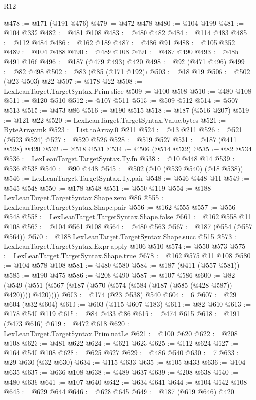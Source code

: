 \begin{lexlean}{R12}
\begin{coremodule}
@478 := @171 (@191 @476)
@479 := @472 @478
@480 := @104 @199
@481 := @104 @332
@482 := @481 @108
@483 := @480 @482
@484 := @114 @483
@485 := @112 @484
@486 := @162 @189
@487 := @486 @91
@488 := @105 @352
@489 := @104 @488
@490 := @489 @108
@491 := @487 @490
@493 := @485 @491 @166
@496 := @187 (@479 @493) @420
@498 := @92 (@471 @496)
@499 := @82 @498
@502 := @83 (@85 (@171 @192))
@503 := @18 @19
@506 := @502 (@23 @503) @22
@507 := @178 @22
@508 := LexLeanTarget.TargetSyntax.Prim.slice
@509 := @100 @508
@510 := @480 @108
@511 := @120 @510
@512 := @107 @511
@513 := @509 @512
@514 := @507 @513
@515 := @473 @86
@516 := @190 @515
@518 := @187 (@516 @207)
@519 := @121 @22
@520 := LexLeanTarget.TargetSyntax.Value.bytes
@521 := ByteArray.mk
@523 := List.toArray.{0} @211
@524 := @13 @211
@526 := @521 (@523 @524)
@527 := @520 @526
@528 := @519 @527
@531 := @187 (@411 @528) @420
@532 := @518 @531
@534 := @506 (@514 @532)
@535 := @82 @534
@536 := LexLeanTarget.TargetSyntax.Ty.fn
@538 := @10 @448 @14
@539 := @536 @538
@540 := @90 @448
@545 := @502 (@10 (@539 @540) (@18 @538))
@546 := LexLeanTarget.TargetSyntax.Ty.pair
@548 := @546 @448 @11
@549 := @545 @548
@550 := @178 @548
@551 := @550 @119
@554 := @188 LexLeanTarget.TargetSyntax.Shape.zero @86
@555 := LexLeanTarget.TargetSyntax.Shape.pair
@556 := @162 @555
@557 := @556 @548
@558 := LexLeanTarget.TargetSyntax.Shape.false
@561 := @162 @558 @11 @108
@563 := @104 @561 @108
@564 := @480 @563
@567 := @187 (@554 (@557 @564))
@570 := @188 LexLeanTarget.TargetSyntax.Shape.succ @515
@573 := LexLeanTarget.TargetSyntax.Expr.apply @106 @510
@574 := @550 @573
@575 := LexLeanTarget.TargetSyntax.Shape.true
@578 := @162 @575 @11 @108
@580 := @104 @578 @108
@581 := @480 @580
@584 := @187 (@411 (@557 @581))
@585 := @190 @475
@586 := @208 @490
@587 := @107 @586
@600 := @82 (@549 (@551 (@567 (@187 (@570 (@574 (@584 (@187 (@585 (@428 @587)) @420)))) @420))))
@603 := @174 (@23 @538) @540
@604 := 6
@607 := @29 @604 (@32 @604)
@610 := @603 (@115 @607 @183)
@611 := @82 @610
@613 := @178 @540 @119
@615 := @84 @433 @86
@616 := @474 @615
@618 := @191 (@473 @616)
@619 := @472 @618
@620 := LexLeanTarget.TargetSyntax.Prim.natLe
@621 := @100 @620
@622 := @208 @108
@623 := @481 @622
@624 := @621 @623
@625 := @112 @624
@627 := @164 @540 @108
@628 := @625 @627
@629 := @486 @540
@630 := 7
@633 := @29 @630 (@32 @630)
@634 := @115 @633
@635 := @105 @433
@636 := @104 @635
@637 := @636 @108
@638 := @489 @637
@639 := @208 @638
@640 := @480 @639
@641 := @107 @640
@642 := @634 @641
@644 := @104 @642 @108
@645 := @629 @644
@646 := @628 @645
@649 := @187 (@619 @646) @420

\end{coremodule}
\end{lexlean}
